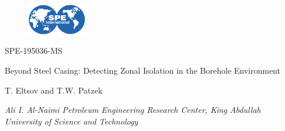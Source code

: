 \documentclass[10pt,twoside]{article}
\begin{document}
\pagestyle{fancy}


\rfoot[]{}
\cfoot[]{}
\lfoot[]{}

\setlength{\columnseprule}{0pt}

\newcommand{\trp}{^{\scriptsize \text{T}}}
\newcommand{\itp}{^{\scriptsize -\text{T}}}
\newcommand{\sqrtp}{^{\scriptsize \text{T/2}}}
\newcommand{\isqrtp}{^{\scriptsize -\text{T/2}}}
\newcommand{\inv}{^{\scriptsize -1}}
\newcommand{\sqr}{^{\scriptsize \text{1/2}}}
\newcommand{\invsqr}{^{\scriptsize -\text{1/2}}}

\newcommand{\TCR}[1]{\textcolor{red}{{#1}}}
\newcommand{\TCB}[1]{\textcolor{blue}{{#1}}}
\newcommand{\TCM}[1]{\textcolor{magenta}{{#1}}}

\thispagestyle{empty}
\vspace*{-1.0in}

\begin{figure}[!ht]
\flushright
\includegraphics[width=0.23\textwidth]{./SPEInt}
\setlength{\abovecaptionskip}{-10pt}
\end{figure}


{\noindent \sffamily \Large SPE-195036-MS}

\vspace*{32pt}

{\noindent \sffamily \Large {Beyond Steel Casing: Detecting Zonal Isolation in the Borehole Environment}}


{\noindent \sffamily T. Eltsov and T.W. Patzek}

        \noindent\textit{Ali I. Al-Naimi Petroleum Engineering Research Center, King Abdullah University of Science and Technology}\newline

\bigskip
\end{document}
